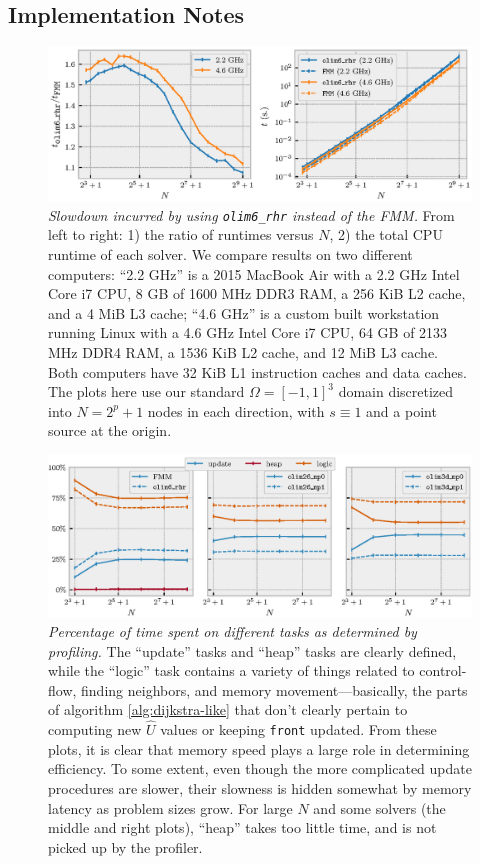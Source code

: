\documentclass[smallcondensed]{svjour3}
\begin{document}
\subsection{Implementation Notes}\label{ssec:impl-notes}

\begin{figure}
  \centering \includegraphics[width=\linewidth]{speed-comparison.eps}%
  \caption{\emph{Slowdown incurred by using \texttt{olim6\_rhr}
      instead of the FMM.} From left to right: 1) the ratio of
    runtimes versus $N$, 2) the total CPU runtime of each solver. We
    compare results on two different computers: ``2.2 GHz'' is a 2015
    MacBook Air with a 2.2 GHz Intel Core i7 CPU, 8 GB of 1600 MHz
    DDR3 RAM, a 256 KiB L2 cache, and a 4 MiB L3 cache; ``4.6 GHz'' is
    a custom built workstation running Linux with a 4.6 GHz Intel Core
    i7 CPU, 64 GB of 2133 MHz DDR4 RAM, a 1536 KiB L2 cache, and 12
    MiB L3 cache. Both computers have 32 KiB L1 instruction caches and
    data caches. The plots here use our standard $\Omega = [-1, 1]^3$
    domain discretized into $N = 2^p + 1$ nodes in each direction,
    with $s \equiv 1$ and a point source at the
    origin.}\label{fig:speed-comparison}
\end{figure}

\begin{figure}
  \includegraphics[width=\linewidth]{tasks.eps}%
  \caption{\emph{Percentage of time spent on different tasks as
      determined by profiling.} The ``update'' tasks and ``heap''
    tasks are clearly defined, while the ``logic'' task contains a
    variety of things related to control-flow, finding neighbors, and
    memory movement---basically, the parts of algorithm
    \ref{alg:dijkstra-like} that don't clearly pertain to computing
    new $\hat{U}$ values or keeping \texttt{front} updated. From these
    plots, it is clear that memory speed plays a large role in
    determining efficiency. To some extent, even though the more
    complicated update procedures are slower, their slowness is hidden
    somewhat by memory latency as problem sizes grow. For large $N$
    and some solvers (the middle and right plots), ``heap'' takes too
    little time, and is not picked up by the
    profiler.}\label{fig:tasks}
\end{figure}
\end{document}

